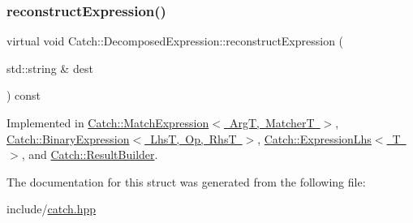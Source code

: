\mbox{\label{struct_catch_1_1_decomposed_expression_a9ce7f356dc96f11f80e40c82f5aa7e55}} 
\subsubsection{\texorpdfstring{reconstruct\+Expression()}{reconstructExpression()}}
{\footnotesize\ttfamily virtual void Catch\+::\+Decomposed\+Expression\+::reconstruct\+Expression (\begin{DoxyParamCaption}\item[{std\+::string \&}]{dest }\end{DoxyParamCaption}) const\hspace{0.3cm}{\ttfamily [pure virtual]}}



Implemented in \mbox{\hyperlink{class_catch_1_1_match_expression_a4410a93bc5b8241eb2502f400fce7ec4}{Catch\+::\+Match\+Expression$<$ Arg\+T, Matcher\+T $>$}}, \mbox{\hyperlink{class_catch_1_1_binary_expression_a6ed73ff9af9c229f9fa3d35d019f9e37}{Catch\+::\+Binary\+Expression$<$ Lhs\+T, Op, Rhs\+T $>$}}, \mbox{\hyperlink{class_catch_1_1_expression_lhs_a7684a053e8e88a4be475a536252630da}{Catch\+::\+Expression\+Lhs$<$ T $>$}}, and \mbox{\hyperlink{class_catch_1_1_result_builder_a7d94b15cf04301a8617e7b16158b5d82}{Catch\+::\+Result\+Builder}}.



The documentation for this struct was generated from the following file\+:\begin{DoxyCompactItemize}
\item 
include/\mbox{\hyperlink{catch_8hpp}{catch.\+hpp}}\end{DoxyCompactItemize}
